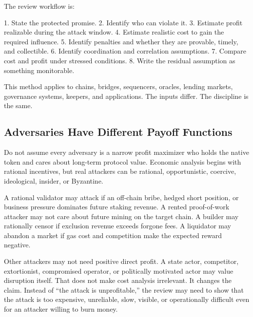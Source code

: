 The review workflow is:

\begin{codeblock}
1. State the protected promise.
2. Identify who can violate it.
3. Estimate profit realizable during the attack window.
4. Estimate realistic cost to gain the required influence.
5. Identify penalties and whether they are provable, timely, and collectible.
6. Identify coordination and correlation assumptions.
7. Compare cost and profit under stressed conditions.
8. Write the residual assumption as something monitorable.
\end{codeblock}

This method applies to chains, bridges, sequencers, oracles, lending markets, governance systems, keepers, and applications. The inputs differ. The discipline is the same.

\subsection{Adversaries Have Different Payoff Functions}

Do not assume every adversary is a narrow profit maximizer who holds the native token and cares about long-term protocol value. Economic analysis begins with rational incentives, but real attackers can be rational, opportunistic, coercive, ideological, insider, or Byzantine.

A rational validator may attack if an off-chain bribe, hedged short position, or business pressure dominates future staking revenue. A rented proof-of-work attacker may not care about future mining on the target chain. A builder may rationally censor if exclusion revenue exceeds forgone fees. A liquidator may abandon a market if gas cost and competition make the expected reward negative.

Other attackers may not need positive direct profit. A state actor, competitor, extortionist, compromised operator, or politically motivated actor may value disruption itself. That does not make cost analysis irrelevant. It changes the claim. Instead of ``the attack is unprofitable,'' the review may need to show that the attack is too expensive, unreliable, slow, visible, or operationally difficult even for an attacker willing to burn money.


